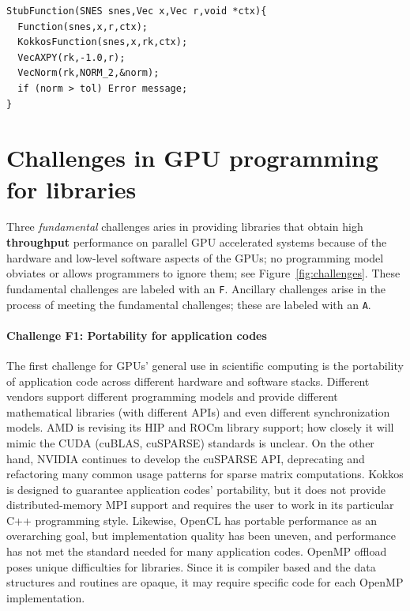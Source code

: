\documentclass[10pt,journal,compsoc]{IEEEtran}
\begin{document}
\begin{lstlisting}[caption={Stub routine that runs both implementations},label={lst:stub},frame=single,captionpos=b]
StubFunction(SNES snes,Vec x,Vec r,void *ctx){
  Function(snes,x,r,ctx);
  KokkosFunction(snes,x,rk,ctx);
  VecAXPY(rk,-1.0,r);
  VecNorm(rk,NORM_2,&norm);
  if (norm > tol) Error message;
}
\end{lstlisting}


\section{Challenges in GPU programming for libraries}
\label{sec:challenges}


Three {\em fundamental} challenges aries in providing libraries that obtain high {\bf throughput}  performance on parallel GPU
accelerated systems because of the hardware and low-level software aspects
of the GPUs; no programming model obviates or allows programmers to ignore
them; see Figure~\ref{fig:challenges}. These fundamental challenges are labeled with an {\tt F}. Ancillary challenges arise in the process of
meeting the fundamental challenges; these are labeled with an {\tt A}.


\paragraph{Challenge F1: Portability for application codes}

The first challenge for GPUs' general use in scientific computing is
the portability of application code across different hardware and software stacks. Different vendors support different programming models and provide
different mathematical libraries (with different APIs) and even different
synchronization models. AMD is
revising its HIP and ROCm library support; how closely
it will mimic the CUDA (cuBLAS, cuSPARSE) standards is unclear. On the other hand, NVIDIA
continues to develop the cuSPARSE API, deprecating and refactoring many common usage
patterns for sparse matrix computations.
Kokkos is designed to guarantee application codes' portability, but it does
not provide distributed-memory MPI support and requires the user to work in
its particular C++ programming style. Likewise, OpenCL has portable performance as
an overarching goal, but implementation quality has been uneven, and performance has not met the standard needed for many application codes. OpenMP offload  poses unique difficulties for libraries. Since it is compiler based and the data structures and routines are opaque, it may require specific code for each OpenMP implementation. 
\end{document}
